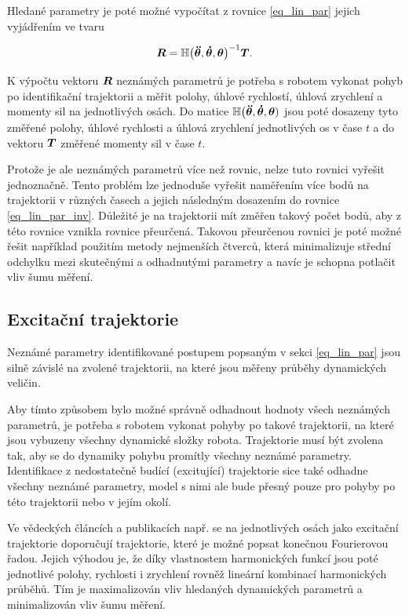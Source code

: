 Hledané parametry je poté možné vypočítat z rovnice \eqref{eq_lin_par} jejich vyjádřením ve tvaru

\begin{equation}
\boldsymbol{R} = \mathbb{H}\big(\boldsymbol{\ddot{\theta}},\boldsymbol{\dot{\theta}},\boldsymbol{\theta}\big)^{-1}\boldsymbol{T}.
\label{eq_lin_par_inv}
\end{equation}

K výpočtu vektoru $\boldsymbol{R}$ neznámých parametrů je potřeba s robotem vykonat pohyb po identifikační trajektorii a měřit polohy, úhlové rychlostí, úhlová zrychlení a momenty sil na jednotlivých osách. Do matice $\mathbb{H}\big(\boldsymbol{\ddot{\theta}},\boldsymbol{\dot{\theta}},\boldsymbol{\theta})$ jsou poté dosazeny tyto změřené polohy, úhlové rychlosti a úhlová zrychlení jednotlivých os v čase $t$ a do vektoru $\boldsymbol{T}$ změřené momenty sil v čase $t$. 

Protože je ale neznámých parametrů více než rovnic, nelze tuto rovnici vyřešit jednoznačně. Tento problém lze jednoduše vyřešit naměřením více bodů na trajektorii v různých časech a jejich následným dosazením do rovnice \eqref{eq_lin_par_inv}. Důležité je na trajektorii mít změřen takový počet bodů, aby z této rovnice vznikla rovnice přeurčená. Takovou přeurčenou rovnici je poté možné řešit například použitím metody nejmenších čtverců, která minimalizuje střední odchylku mezi skutečnými a odhadnutými parametry a navíc je schopna potlačit vliv šumu měření. 

\subsection{Excitační trajektorie}

Neznámé parametry identifikované postupem popsaným v sekci \ref{eq_lin_par} jsou silně závislé na zvolené trajektorii, na které jsou měřeny průběhy dynamických veličin. 

Aby tímto způsobem bylo možné správně odhadnout hodnoty všech neznámých parametrů, je potřeba s robotem vykonat pohyby po takové trajektorii, na které jsou vybuzeny všechny dynamické složky robota. Trajektorie musí být zvolena tak, aby se do dynamiky pohybu promítly všechny neznámé parametry. Identifikace z nedostatečně budící (excitující) trajektorie sice také odhadne všechny neznámé parametry, model s nimi ale bude přesný pouze pro pohyby po této trajektorii nebo v jejím okolí.

Ve vědeckých článcích a publikacích např. \cite{dyn_mod_ind}\cite{dyn_ind_mits}\cite{clos_dyn_par} se na jednotlivých osách jako excitační trajektorie doporučují trajektorie, které je možné popsat konečnou Fourierovou řadou. Jejich výhodou je, že díky vlastnostem harmonických funkcí jsou poté jednotlivé polohy, rychlosti i zrychlení rovněž lineární kombinací harmonických průběhů. Tím je maximalizován vliv hledaných dynamických parametrů a minimalizován vliv šumu měření. 

